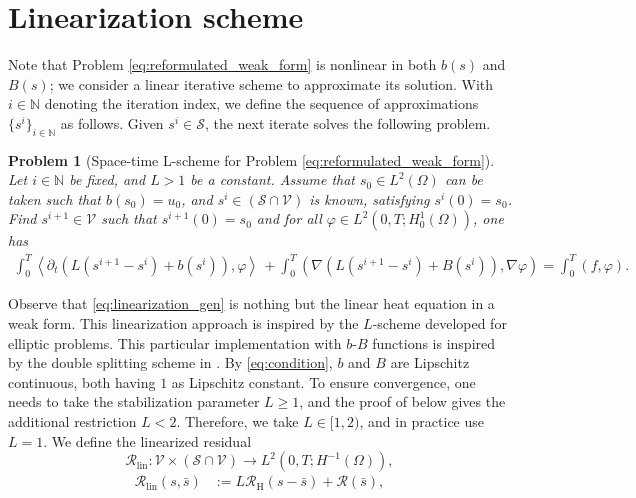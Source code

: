 \documentclass[review,11pt]{article}
\numberwithin{equation}{section}
\def \Om {\Omega}
\def \N  {{\mathbb{N}}}
\def \calV {\mathcal{V}}
\def \calW {\mathcal{W}}
\newtheorem{problem}{Problem}
\newcounter{Ass}
\begin{document}
\section{Linearization scheme}\label{Linearization}
Note that Problem \ref{eq:reformulated_weak_form} is nonlinear in both $b(s)$ and $B(s)$; we consider a linear iterative scheme to approximate its solution.
With $i \in \mathbb{N}$ denoting the iteration index, we define the sequence of approximations \(\{s^i\}_{i \in \mathbb{N} }\) as follows. Given $s^i \in \mathcal{S}$, the next iterate solves the following problem. 
\begin{problem}[{Space-time L-scheme for Problem \ref{eq:reformulated_weak_form}}]\label{pb:2}
Let $i\in \N$ be fixed, and $L>1$ be a constant. Assume that $s_0 \in L^2(\Omega)$ can be taken such that $b(s_0) = u_0$, and $s^i \in  (\mathcal{S}\cap \calV)$ is known, satisfying $s^i(0)=s_0$. Find $s^{i+1} \in \mathcal{V}$ such that $s^{i+1}(0)=s_0$ and for all $\varphi \in  L^2(0,T;H_0^1(\Omega))$, one has
\begin{align}\label{eq:linearization_gen}
\int_0^T \!\left\langle \partial_t \left( L(s^{i+1} - s^i) + b(s^i) \right), \varphi \right\rangle \,  
+ \int_0^T \!\left( \nabla \left( L(s^{i+1} - s^i) + B(s^i) \right), \nabla \varphi \right) 
= \int_0^T \!( f, \varphi ).
\end{align}
\end{problem}
Observe that \eqref{eq:linearization_gen} is nothing but the linear heat equation in a weak form. This linearization approach is inspired by the $L$-scheme \cite{list2016study,pop2004mixed} developed for elliptic problems. This particular implementation with $b$-$B$ functions is inspired by the double splitting scheme in \cite{javed2025robust}. By \eqref{eq:condition}, $b$ and $B$ are Lipschitz continuous, both having $1$ as 
Lipschitz constant. To ensure convergence, one needs to take the stabilization parameter $L \geq 1$, and the proof of  below gives the additional restriction $L < 2$. Therefore, we take $L \in [1, 2)$, and in practice use $L = 1$. We define the linearized residual
\[
\mathcal{R}_{\mathrm{lin}} :
\mathcal{V}\times(\mathcal{S}\cap\mathcal{V})
\to L^2(0,T;H^{-1}(\Omega)),
\]
\begin{align}\label{eq:defRlin}
\mathcal{R}_{\mathrm{lin}}(s,\bar{s})&:= L \mathcal{R}_{\mathrm{H}}(s-\bar{s}) + \mathcal{R}(\bar{s}),
\end{align}
\end{document}
